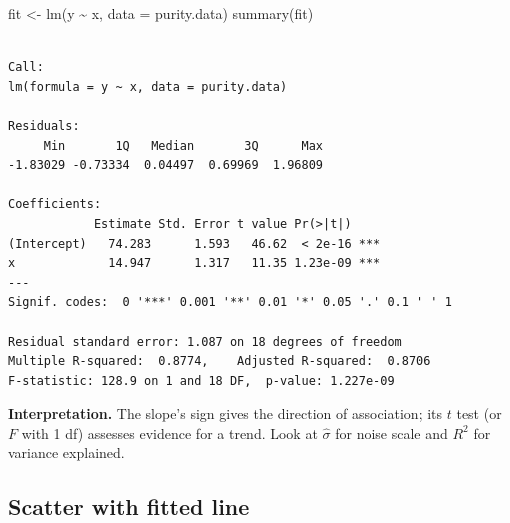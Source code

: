 \documentclass[
  letterpaper,
]{scrbook}
\newenvironment{Shaded}{\begin{snugshade}}{\end{snugshade}}
\newcommand{\AttributeTok}[1]{\textcolor[rgb]{0.40,0.45,0.13}{#1}}
\newcommand{\DecValTok}[1]{\textcolor[rgb]{0.68,0.00,0.00}{#1}}
\newcommand{\FunctionTok}[1]{\textcolor[rgb]{0.28,0.35,0.67}{#1}}
\newcommand{\NormalTok}[1]{\textcolor[rgb]{0.00,0.23,0.31}{#1}}
\newcommand{\OtherTok}[1]{\textcolor[rgb]{0.00,0.23,0.31}{#1}}
\newcommand{\SpecialCharTok}[1]{\textcolor[rgb]{0.37,0.37,0.37}{#1}}
\newcommand{\StringTok}[1]{\textcolor[rgb]{0.13,0.47,0.30}{#1}}
\begin{document}
\begin{Shaded}
\begin{Highlighting}[]
\NormalTok{fit }\OtherTok{\textless{}{-}} \FunctionTok{lm}\NormalTok{(y }\SpecialCharTok{\textasciitilde{}}\NormalTok{ x, }\AttributeTok{data =}\NormalTok{ purity.data)}
\FunctionTok{summary}\NormalTok{(fit)}
\end{Highlighting}
\end{Shaded}

\begin{verbatim}

Call:
lm(formula = y ~ x, data = purity.data)

Residuals:
     Min       1Q   Median       3Q      Max 
-1.83029 -0.73334  0.04497  0.69969  1.96809 

Coefficients:
            Estimate Std. Error t value Pr(>|t|)    
(Intercept)   74.283      1.593   46.62  < 2e-16 ***
x             14.947      1.317   11.35 1.23e-09 ***
---
Signif. codes:  0 '***' 0.001 '**' 0.01 '*' 0.05 '.' 0.1 ' ' 1

Residual standard error: 1.087 on 18 degrees of freedom
Multiple R-squared:  0.8774,    Adjusted R-squared:  0.8706 
F-statistic: 128.9 on 1 and 18 DF,  p-value: 1.227e-09
\end{verbatim}

\textbf{Interpretation.} The slope's sign gives the direction of
association; its \(t\) test (or \(F\) with 1 df) assesses evidence for a
trend. Look at \(\hat\sigma\) for noise scale and \(R^2\) for variance
explained.

\subsection{Scatter with fitted line}\label{scatter-with-fitted-line}

\begin{Shaded}
\end{Shaded}
\end{document}
